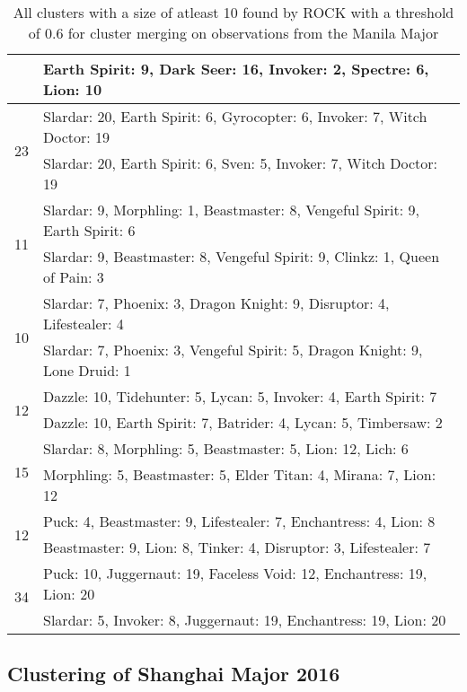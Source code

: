 \documentclass[result.tex]{subfiles}
\begin{document}
\begin{table}[H]
\begin{tabular}{ | c | p{12.5cm} | }
    & Earth Spirit: 9, Dark Seer: 16, Invoker: 2, Spectre: 6, Lion: 10 \\
    \hline
    \multirow{2}{*}{23}
    & Slardar: 20, Earth Spirit: 6, Gyrocopter: 6, Invoker: 7, Witch Doctor: 19 \\
    & Slardar: 20, Earth Spirit: 6, Sven: 5, Invoker: 7, Witch Doctor: 19 \\
    \hline
    \multirow{2}{*}{11}
    & Slardar: 9, Morphling: 1, Beastmaster: 8, Vengeful Spirit: 9, Earth Spirit: 6 \\
    & Slardar: 9, Beastmaster: 8, Vengeful Spirit: 9, Clinkz: 1, Queen of Pain: 3 \\
    \hline
    \multirow{2}{*}{10}
    & Slardar: 7, Phoenix: 3, Dragon Knight: 9, Disruptor: 4, Lifestealer: 4 \\
    & Slardar: 7, Phoenix: 3, Vengeful Spirit: 5, Dragon Knight: 9, Lone Druid: 1 \\
    \hline
    \multirow{2}{*}{12}
    & Dazzle: 10, Tidehunter: 5, Lycan: 5, Invoker: 4, Earth Spirit: 7 \\
    & Dazzle: 10, Earth Spirit: 7, Batrider: 4, Lycan: 5, Timbersaw: 2 \\
    \hline
    \multirow{2}{*}{15}
    & Slardar: 8, Morphling: 5, Beastmaster: 5, Lion: 12, Lich: 6 \\
    & Morphling: 5, Beastmaster: 5, Elder Titan: 4, Mirana: 7, Lion: 12 \\
    \hline
    \multirow{2}{*}{12}
    & Puck: 4, Beastmaster: 9, Lifestealer: 7, Enchantress: 4, Lion: 8 \\
    & Beastmaster: 9, Lion: 8, Tinker: 4, Disruptor: 3, Lifestealer: 7 \\
    \hline
    \multirow{2}{*}{34}
    & Puck: 10, Juggernaut: 19, Faceless Void: 12, Enchantress: 19, Lion: 20 \\
    & Slardar: 5, Invoker: 8, Juggernaut: 19, Enchantress: 19, Lion: 20 \\
    \hline
  \end{tabular}
  \caption{All clusters with a size of atleast 10 found by ROCK with a threshold of 0.6 for cluster merging on observations from the Manila Major}
  \label{tab:cl_manila_rock_all}
\end{table}

\newpage

\subsection*{Clustering of Shanghai Major 2016}
\end{document}
